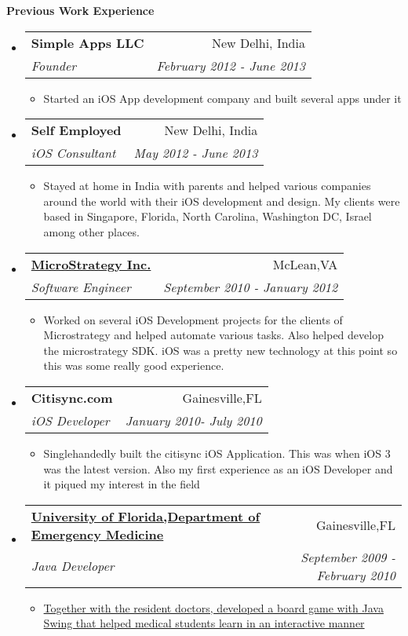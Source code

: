 \documentclass[letterpaper,11pt]{article}
\makeatletter
\newcommand{\resitem}[1]{\item #1 \vspace{-2pt}}
\newcommand{\resheading}[1]{{\large \colorbox{mygrey}{\begin{minipage}{\textwidth}{\textbf{#1 \vphantom{p\^{E}}}}\end{minipage}}}}
\newcommand{\ressubheading}[4]{
\begin{tabular*}{7.0in}{l@{\extracolsep{\fill}}r}
    \textbf{#1} & #2 \\
    \textit{#3} & \textit{#4} \\
\end{tabular*}\vspace{-6pt}}
\makeatother
\begin{document}
\resheading{Previous Work Experience}
\begin{itemize}

\item
    \ressubheading{Simple Apps LLC}{New Delhi, India}{Founder}{February 2012 - June 2013}
    \begin{itemize}
        \resitem{Started an iOS App development company and built several apps under it}
    \end{itemize}
    
\item
    \ressubheading{{Self Employed}}{New Delhi, India}{iOS Consultant}{May 2012 - June 2013}
    \begin{itemize}
        \resitem{Stayed at home in India with parents and helped various companies around the world with their iOS development and design. My clients were based in Singapore, Florida, North Carolina, Washington DC, Israel among other places.}
        
    \end{itemize}


\item
    \ressubheading{\href{http://www.microstrategy.com/Company}{MicroStrategy Inc.}}{McLean,VA}{Software Engineer}{September 2010 - January 2012}
    \begin{itemize}
        \resitem{Worked on several iOS Development projects for the clients of Microstrategy and helped automate various tasks. Also helped develop the microstrategy SDK. iOS was a pretty new technology at this point so this was some really good experience.}
    \end{itemize}
    

\item
    \ressubheading{Citisync.com}{Gainesville,FL}{iOS Developer}{January 2010- July 2010}
    \begin{itemize}
        \resitem{Singlehandedly built the citisync iOS Application. This was when iOS 3 was the latest version. Also my first experience as an iOS Developer and it piqued my interest in the field}
    \end{itemize}

\item
    \ressubheading{\href{http://emergency.med.ufl.edu}{University of Florida,Department of Emergency Medicine}}{Gainesville,FL}{Java Developer}{September 2009 - February 2010}
    \begin{itemize}
        \resitem{\href{http://onlinelibrary.wiley.com/doi/10.1111/j.1553-2712.2009.00392_16.x/abstract}{Together with the resident doctors, developed a board game with Java Swing that helped medical students learn in an interactive manner}}
    \end{itemize}
                

\end{itemize}
\end{document}
